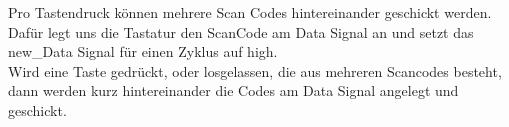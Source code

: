Pro Tastendruck können mehrere Scan Codes hintereinander geschickt werden. Dafür legt uns die Tastatur den ScanCode am Data Signal an und setzt das new\_Data Signal für einen Zyklus auf high.\\
Wird eine Taste gedrückt, oder losgelassen, die aus mehreren Scancodes besteht, dann werden kurz hintereinander die Codes am Data Signal angelegt und geschickt.